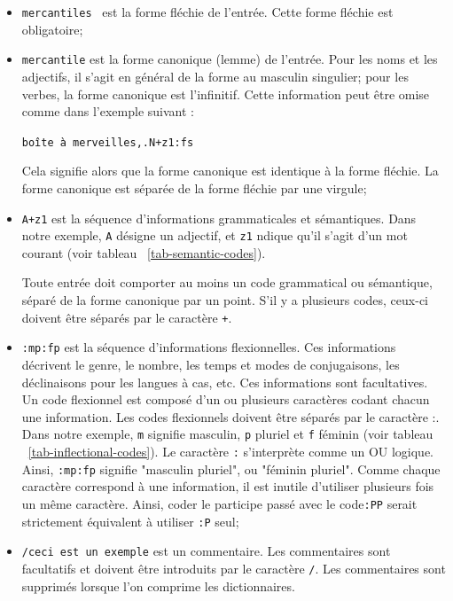 \bigskip
\begin{itemize}
\item \verb+mercantiles + est la forme fléchie de l’entrée. Cette forme fléchie
est obligatoire;
  
\bigskip \item \verb+mercantile+ est la forme canonique (lemme) de l’entrée.
 Pour les noms et les adjectifs, il s’agit
en général de la forme au masculin singulier; pour les verbes, la forme canonique est
l’infinitif. Cette information peut être omise comme dans l’exemple suivant :

  
\bigskip
\verb$boîte à merveilles,.N+z1:fs$
  
\bigskip Cela signifie alors que la forme canonique est identique à la forme fléchie. La forme
canonique est séparée de la forme fléchie par une virgule;
\index{\verbc{,}}
  
\bigskip \item \verb$A+z1$ est la séquence d’informations grammaticales et sémantiques.
 Dans notre exemple, \verb+A+
désigne un adjectif, et \verb+z1+ ndique qu’il s’agit d’un mot courant (voir tableau ~\ref{tab-semantic-codes}).

Toute entrée doit comporter au moins un code grammatical ou sémantique, séparé de
la forme canonique par un point. S’il y a plusieurs codes, ceux-ci doivent être séparés
par le caractère \verb$+$\index{\verbc{+}}.
  
\bigskip
\item \verb+:mp:fp+ est la séquence d’informations flexionnelles.
 Ces informations décrivent le genre, le nombre, les temps et modes
de conjugaisons, les déclinaisons pour les langues à cas, etc. Ces informations sont facultatives.
Un code flexionnel est composé d’un ou plusieurs caractères codant chacun une information. Les codes
flexionnels doivent être séparés par le caractère :. Dans notre exemple, \verb+m+ signifie masculin,
\verb+p+ pluriel et \verb+f+ féminin (voir tableau ~\ref{tab-inflectional-codes}). Le caractère \verb+:+ s’interprète comme un OU logique. Ainsi, \verb+:mp:fp+ signifie "masculin pluriel", ou "féminin pluriel". Comme chaque caractère correspond à une information, il est inutile d’utiliser plusieurs fois un même caractère. Ainsi, coder le participe passé avec le code\verb+:PP+ serait strictement équivalent à utiliser \verb+:P+ seul;\index{\verbc{:}}
  
\bigskip \item \verb+/ceci est un exemple+ est un commentaire. Les commentaires sont facultatifs et
doivent être introduits par le caractère \verb+/+. Les commentaires sont supprimés lorsque
l’on comprime les dictionnaires.  \index{\verbc{/}}
\end{itemize}

